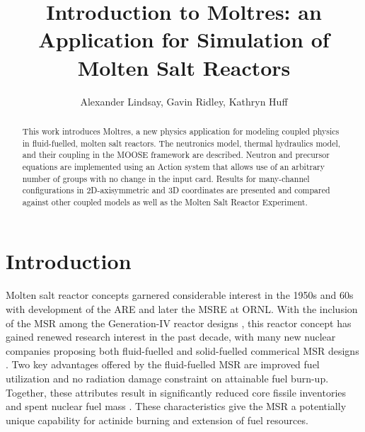 \documentclass{article}
\title{Introduction to Moltres: an Application for Simulation of Molten Salt Reactors}
\author{Alexander Lindsay, Gavin Ridley, Kathryn Huff}
\let\Oldsection\section
\renewcommand{\section}{\FloatBarrier\Oldsection}
\begin{document}
\maketitle

\begin{abstract}

This work introduces Moltres, a new physics application for modeling coupled 
physics in fluid-fuelled, molten salt reactors. The neutronics model, thermal
hydraulics model, and their coupling in the MOOSE framework are
described. Neutron and precursor equations are implemented using an Action
system that allows use of an arbitrary number of groups with no change in the
input card. Results for many-channel configurations in 2D-axisymmetric and 3D
coordinates are presented and compared against other coupled models as
well as the Molten Salt Reactor Experiment.

\end{abstract}

\section{Introduction}

Molten salt reactor concepts garnered considerable interest in the 1950s and 60s
with development of the \gls{ARE} and later the \gls{MSRE} at \gls{ORNL}.  With
the inclusion of the \gls{MSR} among the Generation-IV reactor designs
\cite{noauthor_gif_2015}, this reactor concept has gained renewed research
interest in the past decade, with many new nuclear companies proposing both
fluid-fuelled and solid-fuelled commerical \gls{MSR} designs
\cite{hyde_liquid_2015,leblanc_integral_2015,noauthor_-able_2017,scarlat_design_2014,noauthor_neutronics_2016}. Two
key advantages offered by the fluid-fuelled \gls{MSR} are improved fuel
utilization and no radiation damage constraint on attainable fuel
burn-up. Together, these attributes result in significantly reduced core fissile
inventories and spent nuclear fuel mass \cite{noauthor_gen_2008}.  These
characteristics give the \gls{MSR} a potentially unique capability for actinide
burning and extension of fuel resources.
\end{document}
